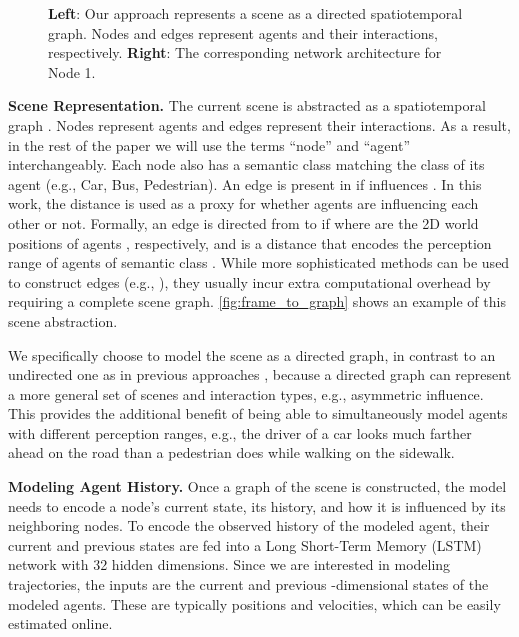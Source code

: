 \documentclass[runningheads]{llncs}
\begin{document}
\begin{figure}[t]
    \centering
    \caption{\textbf{Left}: Our approach represents a scene as a directed spatiotemporal graph. Nodes and edges represent agents and their interactions, respectively. \textbf{Right}: The corresponding network architecture for Node 1.}
    \label{fig:frame_to_graph}
    \label{fig:architecture}
\end{figure}

{\bf Scene Representation.}
The current scene is abstracted as a spatiotemporal graph . Nodes represent agents and edges represent their interactions. As a result, in the rest of the paper we will use the terms ``node'' and ``agent'' interchangeably. Each node also has a semantic class matching the class of its agent (e.g., Car, Bus, Pedestrian). An edge  is present in  if  influences . In this work, the  distance is used as a proxy for whether agents are influencing each other or not. Formally, an edge is directed from  to  if  where  are the 2D world positions of agents , respectively, and  is a distance that encodes the perception range of agents of semantic class . While more sophisticated methods can be used to construct edges (e.g., \cite{VemulaMuellingEtAl2018}), they usually incur extra computational overhead by requiring a complete scene graph. \cref{fig:frame_to_graph} shows an example of this scene abstraction.

We specifically choose to model the scene as a directed graph, in contrast to an undirected one as in previous approaches \cite{JainZamirEtAl2016,AlahiGoelEtAl2016,GuptaJohnsonEtAl2018,VemulaMuellingEtAl2018,IvanovicSchmerlingEtAl2018,IvanovicPavone2019}, because a directed graph can represent a more general set of scenes and interaction types, e.g., asymmetric influence. This provides the additional benefit of being able to simultaneously model agents with different perception ranges, e.g., the driver of a car looks much farther ahead on the road than a pedestrian does while walking on the sidewalk.

{\bf Modeling Agent History.} Once a graph of the scene is constructed, the model needs to encode a node's current state, its history, and how it is influenced by its neighboring nodes. To encode the observed history of the modeled agent, their current and previous states are fed into a Long Short-Term Memory (LSTM) network \cite{HochreiterSchmidhuber1997} with 32 hidden dimensions. Since we are interested in modeling trajectories, the inputs  are the current and previous -dimensional states of the modeled agents. These are typically positions and velocities, which can be easily estimated online.
\end{document}
